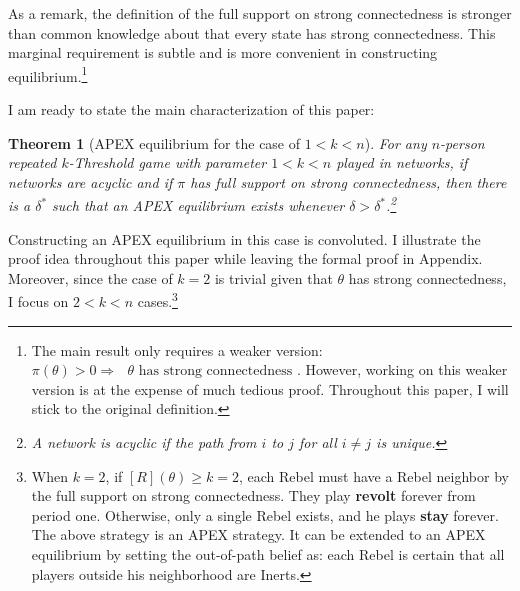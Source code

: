 \documentclass[12pt,letter]{article}
\newtheorem{theorem}{Theorem}
\theoremstyle{definition}
\theoremstyle{remark}
\theoremstyle{claim}
\begin{document}
As a remark, the definition of the full support on strong connectedness is stronger than common knowledge about that every state has strong connectedness. This marginal requirement is subtle and is more convenient in constructing equilibrium.\footnote{The main result only requires a weaker version: $\pi(\theta)>0\Rightarrow \text{ $\theta$ has strong connectedness }$. However, working on this weaker version is at the expense of much tedious proof. Throughout this paper, I will stick to the original definition.} 

I am ready to state the main characterization of this paper:
\begin{theorem}[APEX equilibrium for the case of $1<k<n$]
\label{thm_main_result}
For any $n$-person repeated $k$-Threshold game with parameter $1<k<n$ played in networks, if networks are acyclic and if $\pi$ has full support on strong connectedness, then there is a $\delta^{*}$ such that an APEX equilibrium exists whenever $\delta>\delta^{*}$.\footnote{A network is acyclic if the path from $i$ to $j$ for all $i\neq j$ is unique.}

\end{theorem}

Constructing an APEX equilibrium in this case is convoluted. I illustrate the proof idea throughout this paper while leaving the formal proof in Appendix. Moreover, since the case of $k=2$ is trivial given that $\theta$ has strong connectedness, I focus on $2<k<n$ cases.\footnote{When $k=2$, if $[R](\theta)\geq k=2$, each Rebel must have a Rebel neighbor by the full support on strong connectedness. They play \textbf{revolt} forever from period one. Otherwise, only a single Rebel exists, and he plays \textbf{stay} forever. The above strategy is an APEX strategy. It can be extended to an APEX equilibrium by setting the out-of-path belief as: each Rebel is certain that all players outside his neighborhood are Inerts.}
\end{document}
